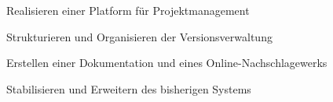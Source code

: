 \begin{frame}
\begin{block}{}
	Realisieren einer Platform für Projektmanagement 
\end{block}
\begin{block}{}
	Strukturieren und Organisieren der Versionsverwaltung
\end{block}
\begin{block}{}
	Erstellen einer Dokumentation und eines Online-Nachschlagewerks
\end{block}
\begin{block}{}
	Stabilisieren und Erweitern des bisherigen Systems
\end{block}
\end{frame}
